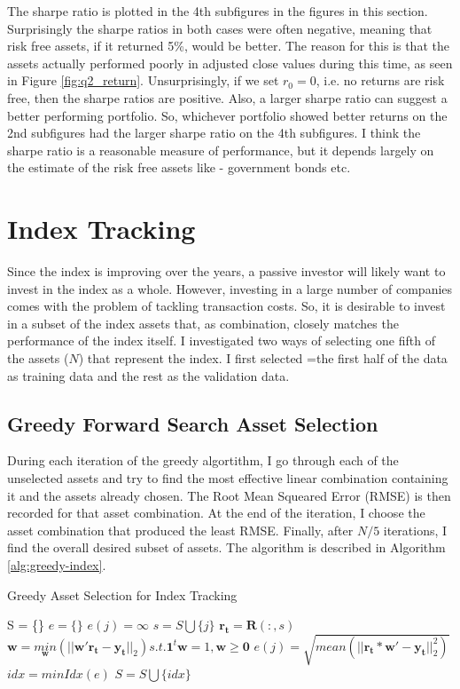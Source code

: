\documentclass[11pt]{article}
\begin{document}
The sharpe ratio is plotted in the 4th subfigures in the figures in this section. Surprisingly the sharpe
ratios in both cases were often negative, meaning that risk free assets, if it returned 5\%, would be better.
The reason for this is that the assets actually performed poorly in adjusted close values during this
time, as seen in Figure \ref{fig:q2_return}. Unsurprisingly, if we set $r_0 = 0$, i.e. no returns are risk free,
then the sharpe ratios are positive. Also, a larger sharpe ratio can suggest a better performing portfolio. So, whichever portfolio showed
better returns on the 2nd subfigures had the larger sharpe ratio on the 4th subfigures. I think the sharpe ratio
is a reasonable measure of performance, but it depends largely on the estimate of the risk free assets like -
government bonds etc.

\section{Index Tracking}

Since the index is improving over the years, a passive investor will likely want to invest in the index as a whole.
However, investing in a large number of companies comes with the problem of tackling transaction costs. So, it is
desirable to invest in a subset of the index assets that, as combination, closely matches the performance of the index
itself. I investigated two ways of selecting one fifth of the assets ($N$) that represent the index. I first selected
 =the first half of the data as training data and the rest as the validation data.

\subsection{Greedy Forward Search Asset Selection}

During each iteration of the greedy algortithm, I go through each of the unselected assets and try to find the most
effective linear combination containing it and the assets already chosen. The Root Mean Squeared Error (RMSE) is then
recorded for that asset combination. At the end of the iteration, I choose the asset combination that produced the 
least RMSE. Finally, after $N/5$ iterations, I find the overall desired subset of assets. The algorithm is described in
Algorithm \ref{alg:greedy-index}.

\begin{algorithm}[H]
\caption{Greedy Asset Selection for Index Tracking}
\label{alg:greedy-index}
\begin{algorithmic}
\State S = \{\}
\State $e = \{\}$
\State $e(j) = \infty$
\Else
\State $s = S \bigcup \{j\}$
\State $\bm{r_t} = \bm{R}(:, s)$
\State $\bm{w} = \underset{\bm{w}}{min}(||\bm{w}'\bm{r_t} - \bm{y_t}||_2) s.t. \bm{1}^t\bm{w} = 1, \bm{w} \geq \bm{0}$
\State $e(j) = \sqrt{mean(||\bm{r_t} * \bm{w}' - \bm{y_t}||_2^2)}$
\EndIf
\EndFor
\State $idx = minIdx(e)$
\State $S = S \bigcup \{idx\}$
\EndFor
\end{algorithmic}
\end{algorithm}
\end{document}
